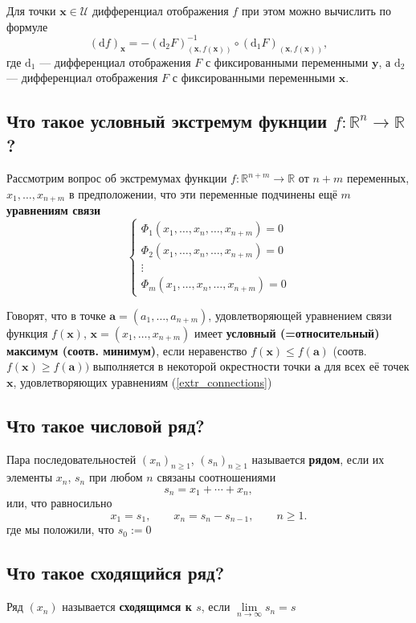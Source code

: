 \documentclass[a4paper]{article}
\newcommand{\m}[1]{\mathbf{#1}}
\begin{document}
Для точки $\m{x} \in \mathscr{U}$ дифференциал отображения $f$ при этом можно вычислить по формуле
$$
(\mathrm{d}f)_\m{x} = - \left( \mathrm{d}_2F \right)^{-1}_{(\m{x}, f(\m{x}))} \circ (\mathrm{d}_1 F)_{(\m{x}, f(\m{x}))},
$$
где $\mathrm{d}_1$ — дифференциал отображения $F$ с фиксированными переменными $\m{y}$, а $\mathrm{d}_2$ — дифференциал отображения $F$ с фиксированными переменными $\m{x}$.

\subsection{Что такое условный экстремум фукнции $f:\mathbb{R}^n\to\mathbb{R}$?}
Рассмотрим вопрос об экстремумах функции $f:\mathbb{R}^{n+m} \to \mathbb{R}$ от $n+m$ переменных, $x_1,\ldots, x_{n+m}$ в предположении, что эти переменные подчинены ещё $m$ \textbf{уравнениям связи}
\begin{equation}\label{extr_connections}
\left\{\begin{matrix}
\Phi_1(x_1,\ldots, x_{n}, \ldots, x_{n+m}) = 0 \\
\Phi_2(x_1,\ldots, x_{n}, \ldots, x_{n+m}) = 0 \\
\vdots\\
\Phi_m(x_1,\ldots, x_{n}, \ldots, x_{n+m}) = 0
\end{matrix} \right.   
\end{equation}

Говорят, что в точке $\m{a} = (a_1,\ldots, a_{n+m})$, удовлетворяющей уравнением связи функция $f(\m{x})$, $\m{x} = (x_1,\ldots, x_{n+m})$ имеет \textbf{условный (=относительный) максимум (соотв. минимум)}, если неравенство $f(\m{x}) \le f(\m{a})$ (соотв. $f(\m{x}) \ge f(\m{a}))$ выполняется в некоторой окрестности точки $\m{a}$ для всех её точек $\m{x}$, удовлетворяющих уравнениям (\ref{extr_connections})


\subsection{Что такое числовой ряд?}
Пара последовательностей $(x_n)_{n \ge 1}$, $(s_n)_{n \ge 1}$ называется \textbf{рядом}, если их элементы $x_n$, $s_n$ при любом $n$ связаны соотношениями
$$
s_n = x_1 + \cdots + x_n,
$$
или, что равносильно
$$
x_1=s_1, \qquad x_n = s_n-s_{n-1}, \qquad n\ge 1.
$$
где мы положили, что $s_0:=0$

\subsection{Что такое сходящийся ряд?}
Ряд $(x_n)$ называется \textbf{сходящимся к $s$}, если $\lim\limits_{n \to \infty}s_n = s$
\end{document}
